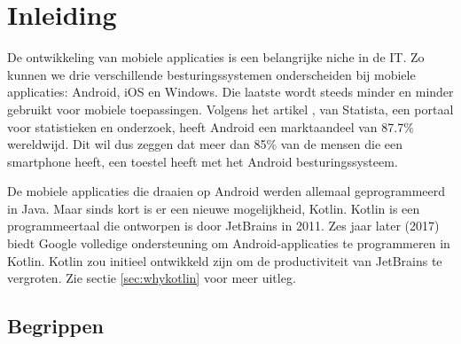\chapter{Inleiding}
\label{ch:inleiding}




 De ontwikkeling van mobiele applicaties is een belangrijke niche in de IT. Zo kunnen we drie verschillende besturingssystemen onderscheiden bij mobiele applicaties: Android, iOS en Windows. Die laatste wordt steeds minder en minder gebruikt voor mobiele toepassingen. Volgens het artikel \textcite{Statista2018}, van Statista, een portaal voor statistieken en onderzoek, heeft Android een marktaandeel van 87.7\% wereldwijd. Dit wil dus zeggen dat meer dan 85\% van de mensen die een smartphone heeft, een toestel heeft met het Android besturingssysteem. 

 De mobiele applicaties die draaien op Android werden allemaal geprogrammeerd in Java. Maar sinds kort is er een nieuwe mogelijkheid, Kotlin. Kotlin is een programmeertaal die ontworpen is door JetBrains in 2011. Zes jaar later (2017) biedt Google volledige ondersteuning om Android-applicaties te programmeren in Kotlin. Kotlin zou initieel ontwikkeld zijn om de productiviteit van JetBrains te vergroten. Zie sectie \ref{sec:whykotlin} voor meer uitleg.
 
 \section{Begrippen}
